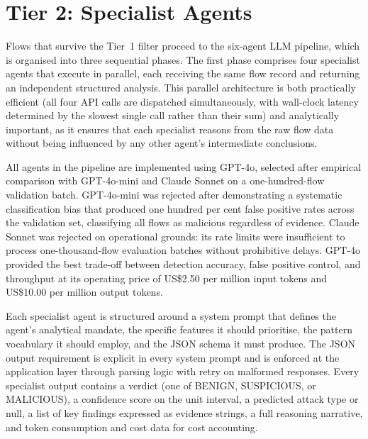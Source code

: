 \documentclass[../main.tex]{subfiles}
\begin{document}
\section{Tier 2: Specialist Agents}
\label{sec:tier2-specialists}

Flows that survive the Tier~1 filter proceed to the six-agent LLM pipeline, which is organised into three sequential phases. The first phase comprises four specialist agents that execute in parallel, each receiving the same flow record and returning an independent structured analysis. This parallel architecture is both practically efficient (all four API calls are dispatched simultaneously, with wall-clock latency determined by the slowest single call rather than their sum) and analytically important, as it ensures that each specialist reasons from the raw flow data without being influenced by any other agent's intermediate conclusions.

All agents in the pipeline are implemented using GPT-4o, selected after empirical comparison with GPT-4o-mini and Claude Sonnet on a one-hundred-flow validation batch. GPT-4o-mini was rejected after demonstrating a systematic classification bias that produced one hundred per cent false positive rates across the validation set, classifying all flows as malicious regardless of evidence. Claude Sonnet was rejected on operational grounds: its rate limits were insufficient to process one-thousand-flow evaluation batches without prohibitive delays. GPT-4o provided the best trade-off between detection accuracy, false positive control, and throughput at its operating price of US\$2.50 per million input tokens and US\$10.00 per million output tokens.

Each specialist agent is structured around a system prompt that defines the agent's analytical mandate, the specific features it should prioritise, the pattern vocabulary it should employ, and the JSON schema it must produce. The JSON output requirement is explicit in every system prompt and is enforced at the application layer through parsing logic with retry on malformed responses. Every specialist output contains a verdict (one of BENIGN, SUSPICIOUS, or MALICIOUS), a confidence score on the unit interval, a predicted attack type or null, a list of key findings expressed as evidence strings, a full reasoning narrative, and token consumption and cost data for cost accounting.
\end{document}
